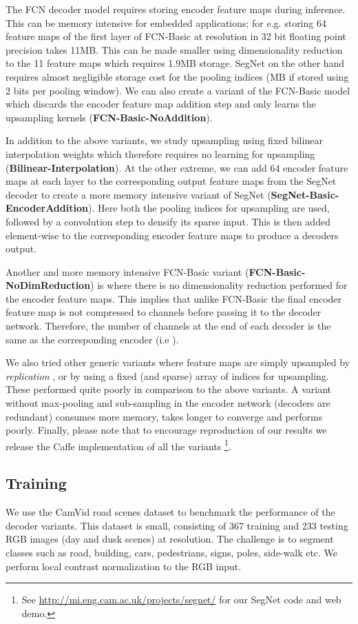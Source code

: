 \documentclass[10pt,journal,compsoc]{IEEEtran}
\begin{document}
The FCN decoder model requires storing encoder feature maps during inference. This can be memory intensive for embedded applications; for e.g. storing 64 feature maps of the first layer of FCN-Basic at  resolution in 32 bit floating point precision takes 11MB. This can be made smaller using dimensionality reduction to the 11 feature maps which requires  1.9MB storage. SegNet on the other hand requires almost negligible storage cost for the pooling indices (MB if stored using 2 bits per  pooling window). We can also create a variant of the FCN-Basic model which discards the encoder feature map addition step and only learns the upsampling kernels (\textbf{FCN-Basic-NoAddition}). 

In addition to the above variants, we study upsampling using fixed bilinear interpolation weights which therefore requires no learning for upsampling (\textbf{Bilinear-Interpolation}). At the other extreme, we can add 64 encoder feature maps at each layer to the corresponding output feature maps from the SegNet decoder to create a more memory intensive variant of SegNet (\textbf{SegNet-Basic-EncoderAddition}).
Here both the pooling indices for upsampling are used, followed by a convolution step to densify its sparse input. This is then added element-wise to the corresponding encoder feature maps to produce a decoders output.

Another and more memory intensive FCN-Basic variant (\textbf{FCN-Basic-NoDimReduction}) is where there is no dimensionality reduction performed for the encoder feature maps. This implies that unlike FCN-Basic the final encoder feature map is not compressed to  channels before passing it to the decoder network. Therefore, the number of channels at the end of each decoder is the same as the corresponding encoder (i.e ). 

We also tried other generic variants where feature maps are simply upsampled by \textit{replication} \cite{FarabetPAMI}, or by using a fixed (and sparse) array of indices for upsampling. These performed quite poorly in comparison to the above variants. A variant without max-pooling and sub-sampling in the encoder network (decoders are redundant) consumes more memory, takes longer to converge and performs poorly. 
Finally, please note that to encourage reproduction of our results we release the Caffe implementation of all the variants \footnote{See \url{ http://mi.eng.cam.ac.uk/projects/segnet/} for our SegNet code and web demo.}. 

\subsection{Training}
\label{Training}
We use the CamVid road scenes dataset to benchmark the performance of the decoder variants. This dataset is small, consisting of 367 training and 233 testing RGB images (day and dusk scenes) at  resolution. The challenge is to segment  classes such as road, building, cars, pedestrians, signs, poles, side-walk etc. We perform local contrast normalization \cite{Jarrett} to the RGB input.
\end{document}
